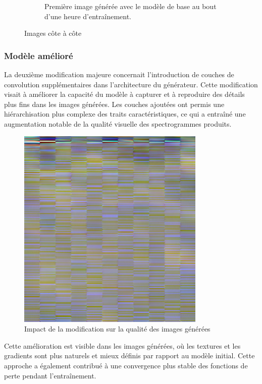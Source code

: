 \begin{figure}[ht]
\begin{subfigure}[b]{0.45\textwidth}
        \caption{Première image générée avec le modèle de base au bout d'une heure d'entraînement.}
        \label{fig:image2}
    \end{subfigure}
    \caption{Images côte à côte}
    \label{fig:images_cote_a_cote}
\end{figure}


\subsubsection{Modèle amélioré}
La deuxième modification majeure concernait l'introduction de couches de convolution supplémentaires dans l'architecture du générateur. Cette modification visait à améliorer la capacité du modèle à capturer et à reproduire des détails plus fins dans les images générées. Les couches ajoutées ont permis une hiérarchisation plus complexe des traits caractéristiques, ce qui a entraîné une augmentation notable de la qualité visuelle des spectrogrammes produits.

\begin{figure}[H]
    \centering
    \includegraphics[width=0.8\textwidth]{logos/generated_samples2.png}
    \caption{Impact de la modification sur la qualité des images générées}
    \label{fig:mod2}
\end{figure}

Cette amélioration est visible dans les images générées, où les textures et les gradients sont plus naturels et mieux définis par rapport au modèle initial. Cette approche a également contribué à une convergence plus stable des fonctions de perte pendant l'entraînement.


